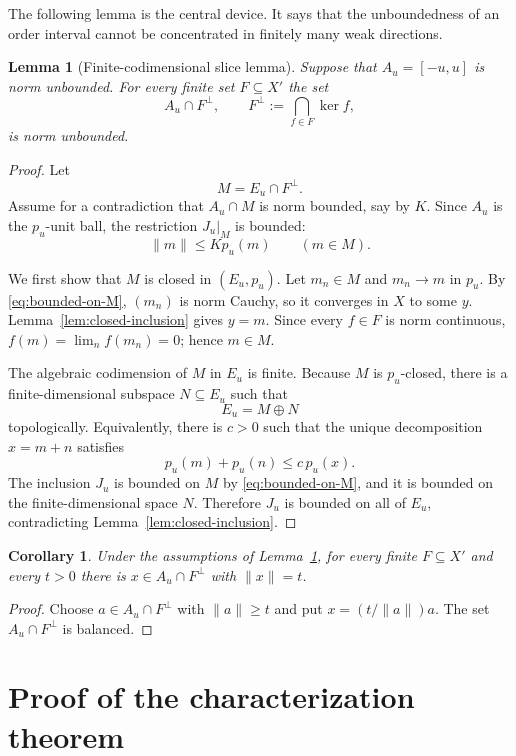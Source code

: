 \documentclass[11pt]{article}
\newtheorem{lemma}[theorem]{Lemma}
\newtheorem{corollary}[theorem]{Corollary}
\theoremstyle{remark}
\newcommand{\norm}[1]{\lVert #1\rVert}
\begin{document}
The following lemma is the central device.  It says that the unboundedness
of an order interval cannot be concentrated in finitely many weak
directions.

\begin{lemma}[Finite-codimensional slice lemma]\label{lem:slice}
Suppose that $A_u=[-u,u]$ is norm unbounded.  For every finite set
$F\subseteq X'$ the set
\[
 A_u\cap F^\perp,
 \qquad
 F^\perp:=\bigcap_{f\in F}\ker f,
\]
is norm unbounded.
\end{lemma}

\begin{proof}
Let
\[
 M=E_u\cap F^\perp.
\]
Assume for a contradiction that $A_u\cap M$ is norm bounded, say by $K$.
Since $A_u$ is the $p_u$-unit ball, the restriction $J_u|_M$ is bounded:
\begin{equation}\label{eq:bounded-on-M}
  \norm{m}\leq Kp_u(m)\qquad(m\in M).
\end{equation}

We first show that $M$ is closed in $(E_u,p_u)$.  Let $m_n\in M$ and
$m_n\to m$ in $p_u$.  By \eqref{eq:bounded-on-M}, $(m_n)$ is norm Cauchy,
so it converges in $X$ to some $y$.  Lemma~\ref{lem:closed-inclusion}
gives $y=m$.  Since every $f\in F$ is norm continuous,
$f(m)=\lim_n f(m_n)=0$; hence $m\in M$.

The algebraic codimension of $M$ in $E_u$ is finite.  Because $M$ is
$p_u$-closed, there is a finite-dimensional subspace $N\subseteq E_u$ such
that
\[
 E_u=M\oplus N
\]
topologically.  Equivalently, there is $c>0$ such that the unique
decomposition $x=m+n$ satisfies
\[
 p_u(m)+p_u(n)\leq c\,p_u(x).
\]
The inclusion $J_u$ is bounded on $M$ by \eqref{eq:bounded-on-M}, and it is
bounded on the finite-dimensional space $N$.  Therefore $J_u$ is bounded on
all of $E_u$, contradicting Lemma~\ref{lem:closed-inclusion}.
\end{proof}

\begin{corollary}\label{cor:exact-radius}
Under the assumptions of Lemma~\ref{lem:slice}, for every finite
$F\subseteq X'$ and every $t>0$ there is $x\in A_u\cap F^\perp$ with
$\norm{x}=t$.
\end{corollary}

\begin{proof}
Choose $a\in A_u\cap F^\perp$ with $\norm{a}\geq t$ and put
$x=(t/\norm{a})a$.  The set $A_u\cap F^\perp$ is balanced.
\end{proof}

\section{Proof of the characterization theorem}
\end{document}
